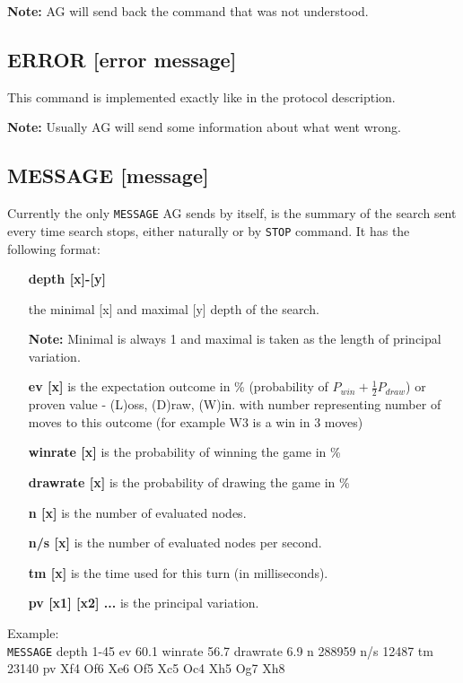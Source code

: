\documentclass[12pt,a4paper]{article}
\begin{document}
\textbf{Note:} AG will send back the command that was not understood.


\subsection{ERROR [error message]}
\label{cmd_error}
This command is implemented exactly like in the protocol description.

\textbf{Note:} Usually AG will send some information about what went wrong.


\subsection{MESSAGE [message]}
\label{cmd_message}
Currently the only \texttt{MESSAGE} AG sends by itself, is the summary of the search sent every time search stops, either naturally or by \texttt{STOP} command. It has the following format:\\
\begin{enumerate}[leftmargin=7.5em]
\item[\textbf{depth [x]-[y]}]{the minimal [x] and maximal [y] depth of the search.

\textbf{Note:} Minimal is always 1 and maximal is taken as the length of principal variation.}
\item[\textbf{ev [x]}]{is the expectation outcome in {\%} (probability of $P_{win} + \frac{1}{2}P_{draw}$) or proven value - (L)oss, (D)raw, (W)in. with number representing number of moves to this outcome (for example W3 is a win in 3 moves)}
\item[\textbf{winrate [x]}]{is the probability of winning the game in {\%}}
\item[\textbf{drawrate [x]}]{is the probability of drawing the game in {\%}}
\item[\textbf{n [x]}]{is the number of evaluated nodes.}
\item[\textbf{n/s [x]}]{is the number of evaluated nodes per second.}
\item[\textbf{tm [x]}]{is the time used for this turn (in milliseconds).}
\item[\textbf{pv [x1] [x2] ...}]{is the principal variation.}
\end{enumerate}

Example:\\
\texttt{MESSAGE} depth 1-45 ev 60.1 winrate 56.7 drawrate 6.9 n 288959 n/s 12487 tm 23140 pv Xf4 Of6 Xe6 Of5 Xc5 Oc4 Xh5 Og7 Xh8 \\
\end{document}
